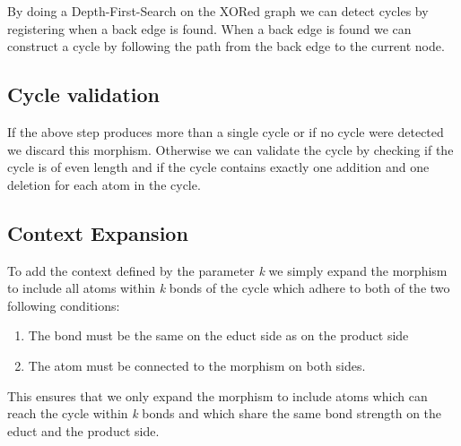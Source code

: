 \documentclass{article}
\begin{document}
By doing a Depth-First-Search on the XORed graph we can detect cycles by registering when a back edge is found. When a back edge is found we can construct a cycle by following the path from the back edge to the current node. 

\subsection{Cycle validation}

If the above step produces more than a single cycle or if no cycle were detected we discard this morphism. Otherwise we can validate the cycle by checking if the cycle is of even length and if the cycle contains exactly one addition and one deletion for each atom in the cycle.

\subsection{Context Expansion}

To add the context defined by the parameter \textit{k} we simply expand the morphism to include all atoms within \textit{k} bonds of the cycle which adhere to both of the two following conditions:
\begin{enumerate}
    \item The bond must be the same on the educt side as on the product side
    \item The atom must be connected to the morphism on both sides.
\end{enumerate}
This ensures that we only expand the morphism to include atoms which can reach the cycle within \textit{k} bonds and which share the same bond strength on the educt and the product side.

\newpage
\end{document}

